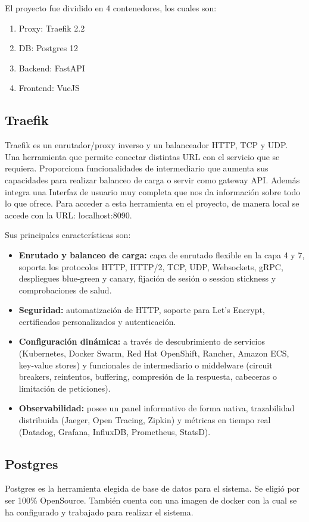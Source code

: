 El proyecto fue dividido en 4 contenedores, los cuales son:
\begin{enumerate}
    \item Proxy: Traefik 2.2
    \item DB: Postgres 12
    \item Backend: FastAPI
    \item Frontend: VueJS
\end{enumerate}

\subsection{Traefik}
Traefik es un enrutador/proxy inverso y un balanceador HTTP, TCP y UDP. Una herramienta que permite conectar distintas URL con el servicio que se requiera. Proporciona funcionalidades de intermediario que aumenta sus capacidades para realizar balanceo de carga o servir como gateway API. Además integra una Interfaz de usuario muy completa que nos da información sobre todo lo que ofrece. Para acceder a esta herramienta en el proyecto, de manera local se accede con la URL: localhost:8090.

Sus principales características son:
\begin{itemize}
    \item \textbf{Enrutado y balanceo de carga: }capa de enrutado flexible en la capa 4 y 7, soporta los protocolos HTTP, HTTP/2, TCP, UDP, Websockets, gRPC, despliegues blue-green y canary, fijación de sesión o session stickness y comprobaciones de salud.
    \item \textbf{Seguridad: }automatización de HTTP, soporte para Let’s Encrypt, certificados personalizados y autenticación.
    \item \textbf{Configuración dinámica: }a través de descubrimiento de servicios (Kubernetes, Docker Swarm, Red Hat OpenShift, Rancher, Amazon ECS, key-value stores) y funcionales de intermediario o middelware (circuit breakers, reintentos, buffering, compresión de la respuesta, cabeceras o limitación de peticiones).
    \item \textbf{Observabilidad: }posee un panel informativo de forma nativa, trazabilidad distribuida (Jaeger, Open Tracing, Zipkin) y métricas en tiempo real (Datadog, Grafana, InfluxDB, Prometheus, StatsD).
\end{itemize}

\subsection{Postgres}
Postgres es la herramienta elegida de base de datos para el sistema. Se eligió por ser 100\% OpenSource. También cuenta con una imagen de docker con la cual se ha configurado y trabajado para realizar el sistema.

